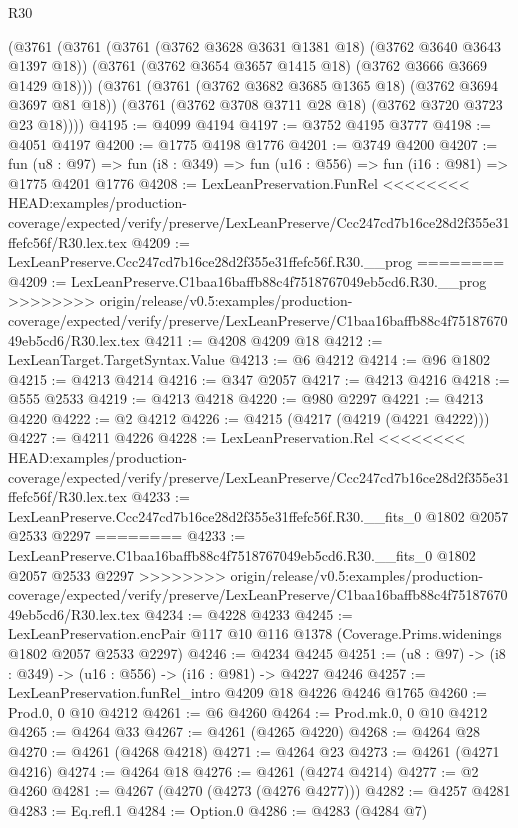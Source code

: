 \begin{lexlean}{R30}
\begin{coremodule}
{{{{{    (@3761
      (@3761
        (@3761 (@3762 @3628 @3631 @1381 @18) (@3762 @3640 @3643 @1397 @18))
        (@3761 (@3762 @3654 @3657 @1415 @18) (@3762 @3666 @3669 @1429 @18)))
      (@3761
        (@3761 (@3762 @3682 @3685 @1365 @18) (@3762 @3694 @3697 @81 @18))
        (@3761 (@3762 @3708 @3711 @28 @18) (@3762 @3720 @3723 @23 @18))))
@4195 := @4099 @4194
@4197 := @3752 @4195 @3777
@4198 := @4051 @4197
@4200 := @1775 @4198 @1776
@4201 := @3749 @4200
@4207 := fun (u8 : @97) =>
  fun (i8 : @349) => fun (u16 : @556) => fun (i16 : @981) => @1775 @4201 @1776
@4208 := LexLeanPreservation.FunRel
<<<<<<<< HEAD:examples/production-coverage/expected/verify/preserve/LexLeanPreserve/Ccc247cd7b16ce28d2f355e31ffefc56f/R30.lex.tex
@4209 := LexLeanPreserve.Ccc247cd7b16ce28d2f355e31ffefc56f.R30.__prog
========
@4209 := LexLeanPreserve.C1baa16baffb88c4f7518767049eb5cd6.R30.__prog
>>>>>>>> origin/release/v0.5:examples/production-coverage/expected/verify/preserve/LexLeanPreserve/C1baa16baffb88c4f7518767049eb5cd6/R30.lex.tex
@4211 := @4208 @4209 @18
@4212 := LexLeanTarget.TargetSyntax.Value
@4213 := @6 @4212
@4214 := @96 @1802
@4215 := @4213 @4214
@4216 := @347 @2057
@4217 := @4213 @4216
@4218 := @555 @2533
@4219 := @4213 @4218
@4220 := @980 @2297
@4221 := @4213 @4220
@4222 := @2 @4212
@4226 := @4215 (@4217 (@4219 (@4221 @4222)))
@4227 := @4211 @4226
@4228 := LexLeanPreservation.Rel
<<<<<<<< HEAD:examples/production-coverage/expected/verify/preserve/LexLeanPreserve/Ccc247cd7b16ce28d2f355e31ffefc56f/R30.lex.tex
@4233 := LexLeanPreserve.Ccc247cd7b16ce28d2f355e31ffefc56f.R30.__fits_0 @1802 @2057 @2533 @2297
========
@4233 := LexLeanPreserve.C1baa16baffb88c4f7518767049eb5cd6.R30.__fits_0 @1802 @2057 @2533 @2297
>>>>>>>> origin/release/v0.5:examples/production-coverage/expected/verify/preserve/LexLeanPreserve/C1baa16baffb88c4f7518767049eb5cd6/R30.lex.tex
@4234 := @4228 @4233
@4245 := LexLeanPreservation.encPair
    @117
    @10
    @116
    @1378
    (Coverage.Prims.widenings @1802 @2057 @2533 @2297)
@4246 := @4234 @4245
@4251 := (u8 : @97) -> (i8 : @349) -> (u16 : @556) -> (i16 : @981) -> @4227 @4246
@4257 := LexLeanPreservation.funRel_intro @4209 @18 @4226 @4246 @1765
@4260 := Prod.{0, 0} @10 @4212
@4261 := @6 @4260
@4264 := Prod.mk.{0, 0} @10 @4212
@4265 := @4264 @33
@4267 := @4261 (@4265 @4220)
@4268 := @4264 @28
@4270 := @4261 (@4268 @4218)
@4271 := @4264 @23
@4273 := @4261 (@4271 @4216)
@4274 := @4264 @18
@4276 := @4261 (@4274 @4214)
@4277 := @2 @4260
@4281 := @4267 (@4270 (@4273 (@4276 @4277)))
@4282 := @4257 @4281
@4283 := Eq.refl.{1}
@4284 := Option.{0}
@4286 := @4283 (@4284 @7)
}}}}}
\end{coremodule}
\end{lexlean}
